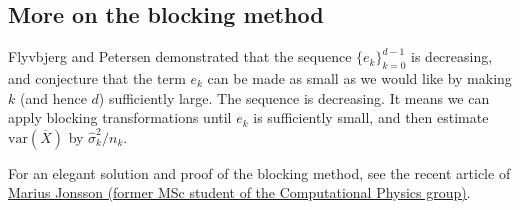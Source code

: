 \documentclass[%
oneside,                 %
final,                   %
10pt]{article}
\begin{document}
\subsection{More on the blocking method}

Flyvbjerg and Petersen demonstrated that the sequence
$\{e_k\}_{k=0}^{d-1}$ is decreasing, and conjecture that the term
$e_k$ can be made as small as we would like by making $k$ (and hence
$d$) sufficiently large. The sequence is decreasing.
It means we can apply blocking transformations until
$e_k$ is sufficiently small, and then estimate $\mathrm{var}(\overline{X})$ by
$\widehat{\sigma}^2_k/n_k$. 

For an elegant solution and proof of the blocking method, see the recent article of \href{{https://journals.aps.org/pre/abstract/10.1103/PhysRevE.98.043304}}{Marius Jonsson (former MSc student of the Computational Physics group)}.

\end{document}
